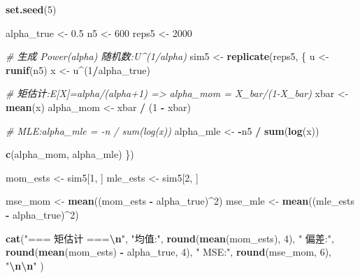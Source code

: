 \documentclass[
]{article}
\newenvironment{Shaded}{\begin{snugshade}}{\end{snugshade}}
\newcommand{\CommentTok}[1]{\textcolor[rgb]{0.56,0.35,0.01}{\textit{#1}}}
\newcommand{\DecValTok}[1]{\textcolor[rgb]{0.00,0.00,0.81}{#1}}
\newcommand{\FloatTok}[1]{\textcolor[rgb]{0.00,0.00,0.81}{#1}}
\newcommand{\FunctionTok}[1]{\textcolor[rgb]{0.13,0.29,0.53}{\textbf{#1}}}
\newcommand{\NormalTok}[1]{#1}
\newcommand{\OtherTok}[1]{\textcolor[rgb]{0.56,0.35,0.01}{#1}}
\newcommand{\SpecialCharTok}[1]{\textcolor[rgb]{0.81,0.36,0.00}{\textbf{#1}}}
\newcommand{\StringTok}[1]{\textcolor[rgb]{0.31,0.60,0.02}{#1}}
\begin{document}
\begin{Shaded}
\begin{Highlighting}[]
\FunctionTok{set.seed}\NormalTok{(}\DecValTok{5}\NormalTok{)}

\NormalTok{alpha\_true }\OtherTok{\textless{}{-}} \FloatTok{0.5}
\NormalTok{n5         }\OtherTok{\textless{}{-}} \DecValTok{600}
\NormalTok{reps5      }\OtherTok{\textless{}{-}} \DecValTok{2000}

\CommentTok{\# 生成 Power(alpha) 随机数:U\^{}(1/alpha)}
\NormalTok{sim5 }\OtherTok{\textless{}{-}} \FunctionTok{replicate}\NormalTok{(reps5, \{}
\NormalTok{  u }\OtherTok{\textless{}{-}} \FunctionTok{runif}\NormalTok{(n5)}
\NormalTok{  x }\OtherTok{\textless{}{-}}\NormalTok{ u}\SpecialCharTok{\^{}}\NormalTok{(}\DecValTok{1}\SpecialCharTok{/}\NormalTok{alpha\_true)}

  \CommentTok{\# 矩估计:E[X]=alpha/(alpha+1) =\textgreater{} alpha\_mom = X\_bar/(1{-}X\_bar)}
\NormalTok{  xbar     }\OtherTok{\textless{}{-}} \FunctionTok{mean}\NormalTok{(x)}
\NormalTok{  alpha\_mom }\OtherTok{\textless{}{-}}\NormalTok{ xbar }\SpecialCharTok{/}\NormalTok{ (}\DecValTok{1} \SpecialCharTok{{-}}\NormalTok{ xbar)}

  \CommentTok{\# MLE:alpha\_mle = {-}n / sum(log(x))}
\NormalTok{  alpha\_mle }\OtherTok{\textless{}{-}} \SpecialCharTok{{-}}\NormalTok{n5 }\SpecialCharTok{/} \FunctionTok{sum}\NormalTok{(}\FunctionTok{log}\NormalTok{(x))}

  \FunctionTok{c}\NormalTok{(alpha\_mom, alpha\_mle)}
\NormalTok{\})}

\NormalTok{mom\_ests }\OtherTok{\textless{}{-}}\NormalTok{ sim5[}\DecValTok{1}\NormalTok{, ]}
\NormalTok{mle\_ests }\OtherTok{\textless{}{-}}\NormalTok{ sim5[}\DecValTok{2}\NormalTok{, ]}

\NormalTok{mse\_mom }\OtherTok{\textless{}{-}} \FunctionTok{mean}\NormalTok{((mom\_ests }\SpecialCharTok{{-}}\NormalTok{ alpha\_true)}\SpecialCharTok{\^{}}\DecValTok{2}\NormalTok{)}
\NormalTok{mse\_mle }\OtherTok{\textless{}{-}} \FunctionTok{mean}\NormalTok{((mle\_ests }\SpecialCharTok{{-}}\NormalTok{ alpha\_true)}\SpecialCharTok{\^{}}\DecValTok{2}\NormalTok{)}

\FunctionTok{cat}\NormalTok{(}\StringTok{"=== 矩估计 ===}\SpecialCharTok{\textbackslash{}n}\StringTok{"}\NormalTok{,}
\StringTok{"均值:"}\NormalTok{, }\FunctionTok{round}\NormalTok{(}\FunctionTok{mean}\NormalTok{(mom\_ests), }\DecValTok{4}\NormalTok{),}
\StringTok{" 偏差:"}\NormalTok{, }\FunctionTok{round}\NormalTok{(}\FunctionTok{mean}\NormalTok{(mom\_ests) }\SpecialCharTok{{-}}\NormalTok{ alpha\_true, }\DecValTok{4}\NormalTok{),}
\StringTok{" MSE:"}\NormalTok{, }\FunctionTok{round}\NormalTok{(mse\_mom, }\DecValTok{6}\NormalTok{), }\StringTok{"}\SpecialCharTok{\textbackslash{}n\textbackslash{}n}\StringTok{"}
\NormalTok{)}
\end{Highlighting}
\end{Shaded}
\end{document}
